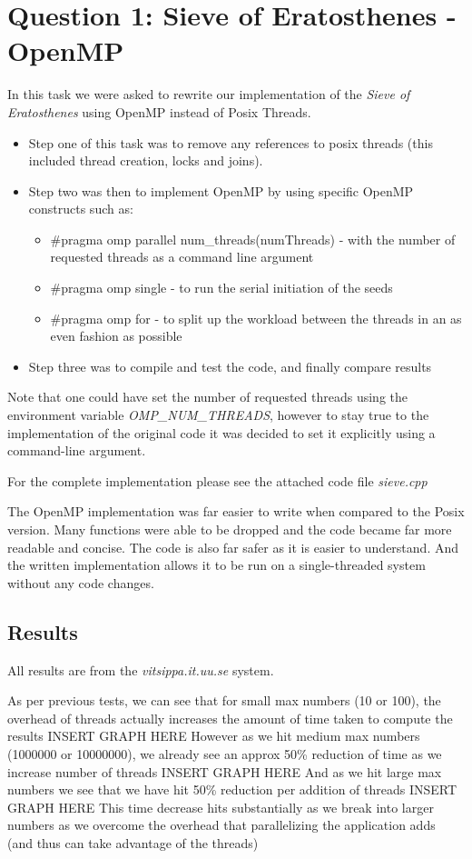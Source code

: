 \section{Question 1: Sieve of Eratosthenes - OpenMP}

In this task we were asked to rewrite our implementation of the \textit{Sieve of Eratosthenes} using OpenMP instead of Posix Threads. 
\begin{itemize}
  \item Step one of this task was to remove any references to posix threads (this included thread creation, locks and joins). 
  \item Step two was then to implement OpenMP by using specific OpenMP constructs such as:
  \begin{itemize}
    \item \#pragma omp parallel num\_threads(numThreads) - with the number of requested threads as a command line argument 
    \item \#pragma omp single - to run the serial initiation of the seeds 
    \item \#pragma omp for - to split up the workload between the threads in an as even fashion as possible
  \end{itemize}
  \item Step three was to compile and test the code, and finally compare results 
\end{itemize}
Note that one could have set the number of requested threads using the environment variable \textit{OMP\_NUM\_THREADS}, 
however to stay true to the implementation of the original code it was decided to set it explicitly using a command-line argument.

For the complete implementation please see the attached code file \textit{sieve.cpp}

The OpenMP implementation was far easier to write when compared to the Posix version. 
Many functions were able to be dropped and the code became far more readable and concise.
The code is also far safer as it is easier to understand. And the written implementation allows it to be run on a single-threaded system without any code changes. 

\subsection{Results}
All results are from the \textit{vitsippa.it.uu.se} system.

As per previous tests, we can see that for small max numbers (10 or 100), the overhead of threads actually increases the amount of time taken to compute the results 
{INSERT GRAPH HERE}
However as we hit medium max numbers (1000000 or 10000000), we already see an approx 50\% reduction of time as we increase number of threads
{INSERT GRAPH HERE}
And as we hit large max numbers we see that we have hit 50\% reduction per addition of threads 
{INSERT GRAPH HERE}
This time decrease hits substantially as we break into larger numbers as we overcome the overhead that parallelizing the application adds (and thus can take advantage of the threads)

